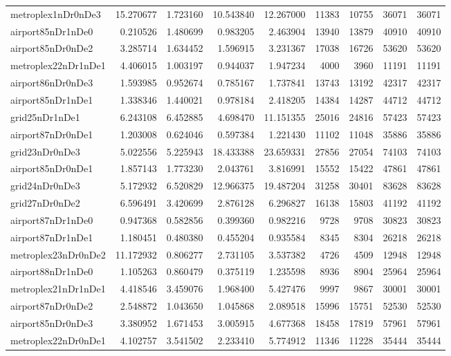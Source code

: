\begin{longtable}{|l|r|r|r|r|r|r|r|r|}
metroplex1nDr0nDe3 & 15.270677 & 1.723160 & 10.543840 & 12.267000 & 11383 & 10755 & 36071 & 36071 \\
airport85nDr1nDe0 & 0.210526 & 1.480699 & 0.983205 & 2.463904 & 13940 & 13879 & 40910 & 40910 \\
airport85nDr0nDe2 & 3.285714 & 1.634452 & 1.596915 & 3.231367 & 17038 & 16726 & 53620 & 53620 \\
metroplex22nDr1nDe1 & 4.406015 & 1.003197 & 0.944037 & 1.947234 & 4000 & 3960 & 11191 & 11191 \\
airport86nDr0nDe3 & 1.593985 & 0.952674 & 0.785167 & 1.737841 & 13743 & 13192 & 42317 & 42317 \\
airport85nDr1nDe1 & 1.338346 & 1.440021 & 0.978184 & 2.418205 & 14384 & 14287 & 44712 & 44712 \\
grid25nDr1nDe1 & 6.243108 & 6.452885 & 4.698470 & 11.151355 & 25016 & 24816 & 57423 & 57423 \\
airport87nDr0nDe1 & 1.203008 & 0.624046 & 0.597384 & 1.221430 & 11102 & 11048 & 35886 & 35886 \\
grid23nDr0nDe3 & 5.022556 & 5.225943 & 18.433388 & 23.659331 & 27856 & 27054 & 74103 & 74103 \\
airport85nDr0nDe1 & 1.857143 & 1.773230 & 2.043761 & 3.816991 & 15552 & 15422 & 47861 & 47861 \\
grid24nDr0nDe3 & 5.172932 & 6.520829 & 12.966375 & 19.487204 & 31258 & 30401 & 83628 & 83628 \\
grid27nDr0nDe2 & 6.596491 & 3.420699 & 2.876128 & 6.296827 & 16138 & 15803 & 41192 & 41192 \\
airport87nDr1nDe0 & 0.947368 & 0.582856 & 0.399360 & 0.982216 & 9728 & 9708 & 30823 & 30823 \\
airport87nDr1nDe1 & 1.180451 & 0.480380 & 0.455204 & 0.935584 & 8345 & 8304 & 26218 & 26218 \\
metroplex23nDr0nDe2 & 11.172932 & 0.806277 & 2.731105 & 3.537382 & 4726 & 4509 & 12948 & 12948 \\
airport88nDr1nDe0 & 1.105263 & 0.860479 & 0.375119 & 1.235598 & 8936 & 8904 & 25964 & 25964 \\
metroplex21nDr1nDe1 & 4.418546 & 3.459076 & 1.968400 & 5.427476 & 9997 & 9867 & 30001 & 30001 \\
airport87nDr0nDe2 & 2.548872 & 1.043650 & 1.045868 & 2.089518 & 15996 & 15751 & 52530 & 52530 \\
airport85nDr0nDe3 & 3.380952 & 1.671453 & 3.005915 & 4.677368 & 18458 & 17819 & 57961 & 57961 \\
metroplex22nDr0nDe1 & 4.102757 & 3.541502 & 2.233410 & 5.774912 & 11346 & 11228 & 35444 & 35444 \\

\end{longtable}
